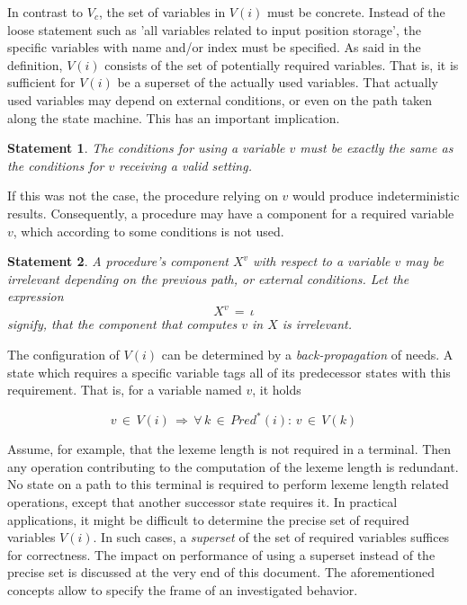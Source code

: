\documentclass[12pt,a4paper]{scrartcl}
\newtheorem{statement}{Statement}
\begin{document}
In contrast to $V_c$, the set of variables in $V(i)$ must be concrete.  Instead
of the loose statement such as 'all variables related to input position
storage', the specific variables with name and/or index must be specified.  As
said in the definition, $V(i)$ consists of the set of potentially required
variables. That is, it is sufficient for $V(i)$ be a superset of the actually
used variables. That actually used variables may depend on external conditions,
or even on the path taken along the state machine. This has an important
implication. 

\begin{statement} \label{stm:relevance-condition}
    The conditions for using a variable $v$ must be exactly the same as the
    conditions for $v$ receiving a valid setting. 
\end{statement}

If this was not the case, the procedure relying on $v$ would produce
indeterministic results. Consequently, a procedure may have a component for a
required variable $v$, which according to some conditions is not used.

\begin{statement}
    A procedure's component $X^v$ with respect to a variable $v$ may be irrelevant
    depending on the previous path, or external conditions. Let the expression
    \begin{equation}
        X^v \,=\,\iota
    \end{equation}
    signify, that the component that computes $v$ in $X$ is irrelevant.
\end{statement}

The configuration of $V(i)$ can be determined by a \textit{back-propagation} of
needs. A state which requires a specific variable tags all of its predecessor
states with this requirement. That is, for a variable named $v$, it holds

\begin{equation}
    v\,\in\,V(i)\,\Rightarrow\,\forall\,k\,\in\,Pred^*(i):\,v\,\in\,V(k)
\end{equation}

Assume, for example, that the lexeme length is not required in a terminal. Then
any operation contributing to the computation of the lexeme length is
redundant.  No state on a path to this terminal is required to perform lexeme
length related operations, except that another successor state requires it.  In
practical applications, it might be difficult to determine the precise set of
required variables $V(i)$. In such cases, a \textit{superset} of the set of
required variables suffices for correctness. The impact on performance of using
a superset instead of the precise set is discussed at the very end of this
document.  The aforementioned concepts allow to specify the frame of an
investigated behavior.  
\end{document}
